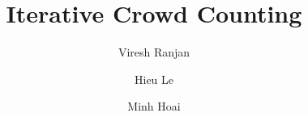 \documentclass[runningheads]{llncs}
\begin{document}
\title{Iterative Crowd Counting} 



\author{Viresh Ranjan \and Hieu Le \and Minh Hoai}






\def\mA{\mathcal{A}}
\def\mB{\mathcal{B}}
\def\mC{\mathcal{C}}
\def\mD{\mathcal{D}}
\def\mE{\mathcal{E}}
\def\mF{\mathcal{F}}
\def\mG{\mathcal{G}}
\def\mH{\mathcal{H}}
\def\mI{\mathcal{I}}
\def\mJ{\mathcal{J}}
\def\mK{\mathcal{K}}
\def\mL{\mathcal{L}}
\def\mM{\mathcal{M}}
\def\mN{\mathcal{N}}
\def\mO{\mathcal{O}}
\def\mP{\mathcal{P}}
\def\mQ{\mathcal{Q}}
\def\mR{\mathcal{R}}
\def\mS{\mathcal{S}}
\def\mT{\mathcal{T}}
\def\mU{\mathcal{U}}
\def\mV{\mathcal{V}}
\def\mW{\mathcal{W}}
\def\mX{\mathcal{X}}
\def\mY{\mathcal{Y}}
\def\mZ{\mathcal{Z}} 

 

\def\1n{\mathbf{1}_n}
\def\0{\mathbf{0}}
\def\1{\mathbf{1}}


\def\A{{\bf A}}
\def\B{{\bf B}}
\def\C{{\bf C}}
\def\D{{\bf D}}
\def\E{{\bf E}}
\def\F{{\bf F}}
\def\G{{\bf G}}
\def\H{{\bf H}}
\def\I{{\bf I}}
\def\J{{\bf J}}
\def\K{{\bf K}}
\def\L{{\bf L}}
\def\M{{\bf M}}
\def\N{{\bf N}}
\def\O{{\bf O}}
\def\P{{\bf P}}
\def\Q{{\bf Q}}
\def\R{{\bf R}}
\def\S{{\bf S}}
\def\T{{\bf T}}
\def\U{{\bf U}}
\def\V{{\bf V}}
\def\W{{\bf W}}
\def\X{{\bf X}}
\def\Y{{\bf Y}}
\def\Z{{\bf Z}}

\def\a{{\bf a}}
\def\b{{\bf b}}
\def\c{{\bf c}}
\def\d{{\bf d}}
\def\e{{\bf e}}
\def\f{{\bf f}}
\def\g{{\bf g}}
\def\h{{\bf h}}
\def\i{{\bf i}}
\def\j{{\bf j}}
\def\k{{\bf k}}
\def\l{{\bf l}}
\def\m{{\bf m}}
\def\n{{\bf n}}
\def\o{{\bf o}}
\def\p{{\bf p}}
\def\q{{\bf q}}
\def\r{{\bf r}}
\def\s{{\bf s}}
\def\t{{\bf t}}
\def\u{{\bf u}}
\def\v{{\bf v}}
\def\w{{\bf w}}
\def\x{{\bf x}}
\def\y{{\bf y}}
\def\z{{\bf z}}

\def\balpha{\mbox{\boldmath{}}}
\def\bbeta{\mbox{\boldmath{}}}
\def\bdelta{\mbox{\boldmath{}}}
\def\bgamma{\mbox{\boldmath{}}}
\def\blambda{\mbox{\boldmath{}}}
\def\bsigma{\mbox{\boldmath{}}}
\def\btheta{\mbox{\boldmath{}}}
\def\bomega{\mbox{\boldmath{}}}
\def\bxi{\mbox{\boldmath{}}}
\def\bnu{\mbox{\boldmath{}}}                                  
\def\bphi{\mbox{\boldmath{}}}
\def\bmu{\mbox{\boldmath{}}}
\end{document}
